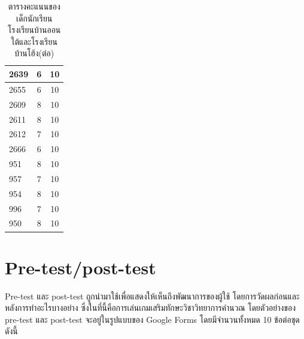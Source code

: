 \begin{table}[h]
\begin{center}
\begin{tabular}{ |l|c|c| }
            \hline
            2639 & 6 & 10\\
            \hline
            2655 & 6 & 10\\
            \hline
            2609 & 8 & 10\\
            \hline
            2611 & 8 & 10\\
            \hline
            2612 & 7 & 10\\
            \hline
            2666 & 6 & 10\\
            \hline
            951 & 8 & 10\\
            \hline
            957 & 7 & 10\\
            \hline
            954 & 8 & 10\\
            \hline
            996 & 7 & 10\\
            \hline
            950 & 8 & 10\\
            \hline
        \end{tabular}
    \end{center}
    \caption[ตารางคะแนนรายของเด็กนักเรียนโรงเรียนบ้านออนใต้และโรงเรียนบ้านโฮ้ง(ต่อ)]{ตารางคะแนนของเด็กนักเรียนโรงเรียนบ้านออนใต้และโรงเรียนบ้านโฮ้ง(ต่อ)}
    \label{studentsscoretablecontinue}
\end{table}

\chapter{Pre-test/post-test}
Pre-test และ post-test ถูกนำมาใช้เพื่อแสดงให้เห็นถึงพัฒนาการของผู้ใช้ โดยการวัดผลก่อนและหลังการทำอะไรบางอย่าง ซึ่งในที่นี้คือการเล่นเกมเสริมทักษะวิชาวิทยาการคำนวณ
โดยตัวอย่างของ pre-test และ post-test จะอยู่ในรูปแบบของ Google Forms โดยมีจำนวนทั้งหมด 10 ข้อต่อชุด ดังนี้
